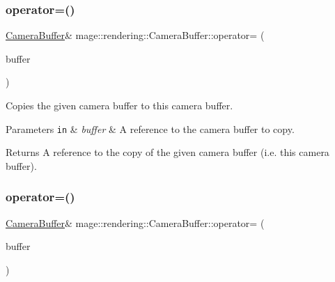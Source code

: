 \subsubsection{\texorpdfstring{operator=()}{operator=()}\hspace{0.1cm}{\footnotesize\ttfamily [1/2]}}
{\footnotesize\ttfamily \mbox{\hyperlink{structmage_1_1rendering_1_1_camera_buffer}{Camera\+Buffer}}\& mage\+::rendering\+::\+Camera\+Buffer\+::operator= (\begin{DoxyParamCaption}\item[{const \mbox{\hyperlink{structmage_1_1rendering_1_1_camera_buffer}{Camera\+Buffer}} \&}]{buffer }\end{DoxyParamCaption})\hspace{0.3cm}{\ttfamily [default]}}

Copies the given camera buffer to this camera buffer.


\begin{DoxyParams}[1]{Parameters}
\mbox{\tt in}  & {\em buffer} & A reference to the camera buffer to copy. \\
\hline
\end{DoxyParams}
\begin{DoxyReturn}{Returns}
A reference to the copy of the given camera buffer (i.\+e. this camera buffer). 
\end{DoxyReturn}
\mbox{\label{structmage_1_1rendering_1_1_camera_buffer_a12658ff989daac2e910b91633ac0223d}} 
\subsubsection{\texorpdfstring{operator=()}{operator=()}\hspace{0.1cm}{\footnotesize\ttfamily [2/2]}}
{\footnotesize\ttfamily \mbox{\hyperlink{structmage_1_1rendering_1_1_camera_buffer}{Camera\+Buffer}}\& mage\+::rendering\+::\+Camera\+Buffer\+::operator= (\begin{DoxyParamCaption}\item[{\mbox{\hyperlink{structmage_1_1rendering_1_1_camera_buffer}{Camera\+Buffer}} \&\&}]{buffer }\end{DoxyParamCaption})\hspace{0.3cm}{\ttfamily [default]}}

